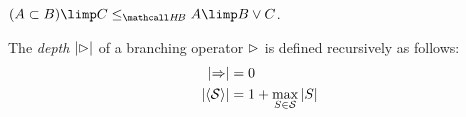 \begin{lemma}
  $(A \lsub B) \limp C \sementHB A \limp B \lor C$.
\end{lemma}

\begin{definition}
  The \emph{depth} $\left|\mathbin{\rhd}\right|$ of a branching operator $\mathbin{\rhd}$ is defined
  recursively as follows:
  \begin{align*}
    \left|\Rightarrow\right| &= 0 \\
    \left|\mathbin{\langle \mathcal{S} \rangle}\right| &= 1 + \max_{S \in \mathcal{S}}{\left|S\right|}
  \end{align*}
\end{definition}



